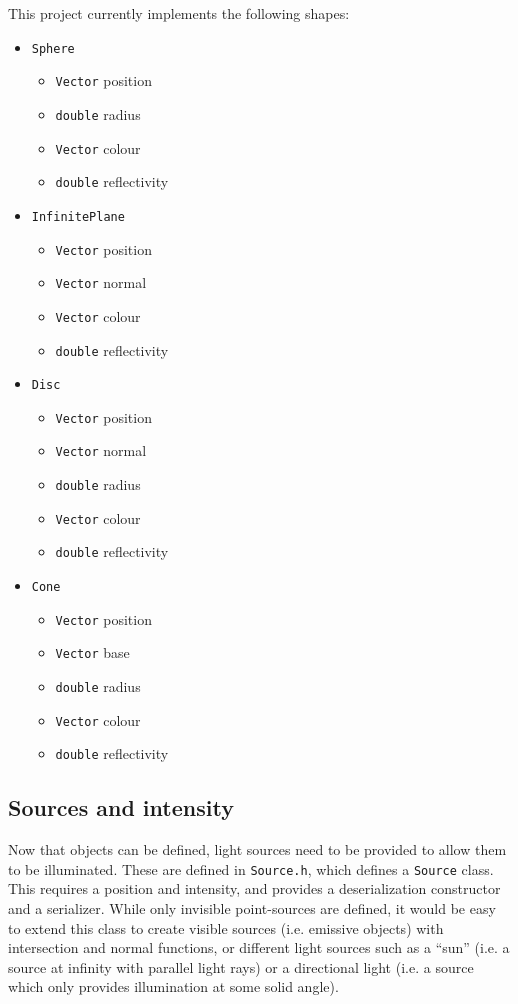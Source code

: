 \documentclass[a4paper]{article}
\begin{document}
This project currently implements the following shapes:
\begin{multicols}{2}
\begin{itemize}
  \item \verb|Sphere|
  \begin{itemize}
    \item \verb|Vector| position
    \item \verb|double| radius
    \item \verb|Vector| colour
    \item \verb|double| reflectivity
  \end{itemize}
  \item \verb|InfinitePlane|
  \begin{itemize}
    \item \verb|Vector| position
    \item \verb|Vector| normal
    \item \verb|Vector| colour
    \item \verb|double| reflectivity
  \end{itemize}
  \vfill\null
  \columnbreak
  \item \verb|Disc|
  \begin{itemize}
    \item \verb|Vector| position
    \item \verb|Vector| normal
    \item \verb|double| radius
    \item \verb|Vector| colour
    \item \verb|double| reflectivity
  \end{itemize}
  \item \verb|Cone|
  \begin{itemize}
    \item \verb|Vector| position
    \item \verb|Vector| base
    \item \verb|double| radius
    \item \verb|Vector| colour
    \item \verb|double| reflectivity
  \end{itemize}
\end{itemize}
\end{multicols}

\subsection{Sources and intensity}
Now that objects can be defined, light sources need to be provided to allow them to be illuminated. These are defined in \verb|Source.h|, which defines a \verb|Source| class. This requires a position and intensity, and provides a deserialization constructor and a serializer. While only invisible point-sources are defined, it would be easy to extend this class to create visible sources (i.e. emissive objects) with intersection and normal functions, or different light sources such as a ``sun'' (i.e. a source at infinity with parallel light rays) or a directional light (i.e. a source which only provides illumination at some solid angle). 
\end{document}
